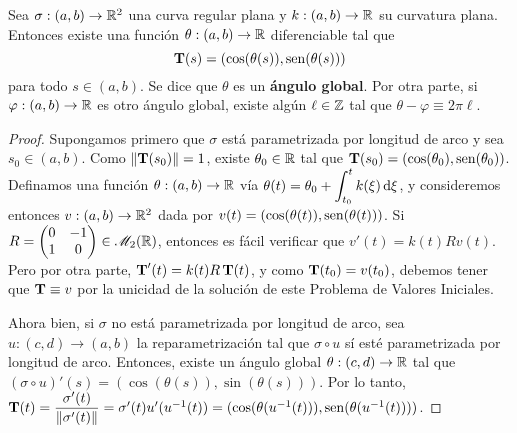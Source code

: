 \begin{prop}
\label{prop::anguloglobal}
Sea $\sigma:(a,b)\to\mathbb{R}^2$ una curva regular plana y $k:(a,b)\to\mathbb{R}$ su curvatura plana. Entonces existe una función $\theta:(a,b)\to\mathbb{R}$ diferenciable tal que $$\operatorname{\mathbf{T}}(s)=(\cos(\theta(s)),\operatorname{sen}(\theta(s)))$$ para todo $s\in(a,b)$. Se dice que $\theta$ es un \textbf{ángulo global}. Por otra parte, si $\varphi:(a,b)\to\mathbb{R}$ es otro ángulo global, existe algún $\ell\in\mathbb{Z}$ tal que $\theta-\varphi\equiv 2\pi\ell$.
\begin{proof}
Supongamos primero que $\sigma$ está parametrizada por longitud de arco y sea $s_0\in(a,b)$. Como $\left\| \operatorname{\mathbf{T}}(s_0) \right\|=1$, existe $\theta_0\in\mathbb{R}$ tal que $\operatorname{\mathbf{T}}(s_0)=(\cos(\theta_0),\operatorname{sen}(\theta_0))$. Definamos una función $\theta:(a,b)\to\mathbb{R}$ vía $\theta(t)=\theta_0 + \displaystyle\int_{t_0}^t k(\xi)\mathop{}\!\mathrm{d}\xi$, y consideremos entonces $v:(a,b)\to\mathbb{R}^2$ dada por $v(t)=(\cos(\theta(t)),\operatorname{sen}(\theta(t)))$. Si $R=\begin{pmatrix}0&-1\\1&0\end{pmatrix}\in\mathscr{M}_2(\mathbb{R})$, entonces es fácil verificar que $v'(t) = k(t)Rv(t)$. Pero por otra parte, $\operatorname{\mathbf{T}}'(t)=k(t)R\operatorname{\mathbf{T}}(t)$, y como $\operatorname{\mathbf{T}}(t_0)=v(t_0)$, debemos tener que $\operatorname{\mathbf{T}}\equiv v$ por la unicidad de la solución de este Problema de Valores Iniciales.

Ahora bien, si $\sigma$ no está parametrizada por longitud de arco, sea $u:(c,d)\to(a,b)$ la reparametrización tal que $\sigma\circ u$ sí esté parametrizada por longitud de arco. Entonces, existe un ángulo global $\theta:(c,d)\to\mathbb{R}$ tal que $(\sigma\circ u)'(s)=(\cos(\theta(s)),\sin(\theta(s)))$. Por lo tanto, $\operatorname{\mathbf{T}}(t)=\dfrac{\sigma'(t)}{\left\| \sigma'(t) \right\|}=\sigma'(t)u'(u^{-1}(t)) = (\cos(\theta(u^{-1}(t))),\operatorname{sen}(\theta(u^{-1}(t))))$.


\end{proof}
\end{prop}
